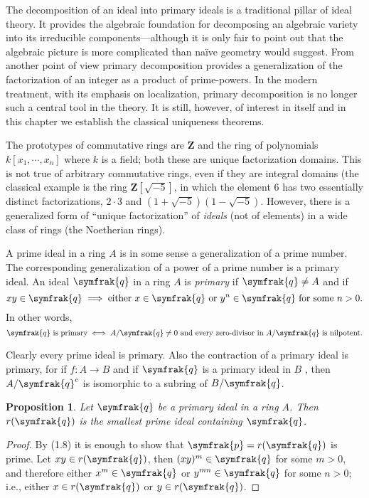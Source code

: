 \documentclass{standalone}
\newtheorem{proposition}[theorem]{Proposition}
\theoremstyle{definition}
\theoremstyle{remark}
\begin{document}
The decomposition of an ideal into primary ideals is a traditional pillar of ideal
theory. It provides the algebraic foundation for decomposing an algebraic
variety into its irreducible components---although it is only fair to point out
that the algebraic picture is more complicated than na\"{i}ve geometry would
suggest. From another point of view primary decomposition provides a generalization
of the factorization of an integer as a product of prime-powers. In
the modern treatment, with its emphasis on localization, primary decomposition
is no longer such a central tool in the theory. It is still, however, of interest in
itself and in this chapter we establish the classical uniqueness theorems.

The prototypes of commutative rings are $\mathbf{Z}$ and the ring of polynomials
 $k[x_1,\cdots,x_n]$ where $k$ is a field; both these are unique factorization domains.
This is not true of arbitrary commutative rings, even if they are integral domains
(the classical example is the ring $\mathbf{Z}[\sqrt{-5}]$, in which the element 6 has two
essentially distinct factorizations, $2\cdot 3$ and $(1+\sqrt{-5})(1-\sqrt{-5})$. However,
there is a generalized form of ``unique factorization'' of \textit{ideals} (not of elements)
in a wide class of rings (the Noetherian rings).

A prime ideal in a ring $A$ is in some sense a generalization of a prime number.
The corresponding generalization of a power of a prime number is a
primary ideal. An ideal $\symfrak{q}$ in a ring $A$ is \textit{primary}
if $\symfrak{q}\neq A$ and if
\[
  xy\in\symfrak{q}\implies\text{either }x\in\symfrak{q}\text{ or
  }y^n\in\symfrak{q}\text{ for some }n>0.
\]
In other words,
\[
\symfrak{q}\text{ is primary}\iff A/\symfrak{q}\ne 0 \text{ and every
  zero-divisor in }A/\symfrak{q}\text{ is nilpotent}.
\]

Clearly every prime ideal is primary. Also the contraction of a primary
ideal is primary, for if $f:A\to B$ and if $\symfrak{q}$ is a primary ideal in
$B$
, then $A/\symfrak{q}^c$ is isomorphic to a subring of $B/\symfrak{q}$.
\begin{proposition}
  Let $\symfrak{q}$ be a primary ideal in a ring $A$. Then $r(\symfrak{q})$ is the smallest
  prime ideal containing $\symfrak{q}$.
\end{proposition}
\begin{proof}
  By (1.8) it is enough to show that $\symfrak{p}=r(\symfrak{q})$ is prime.
  Let $xy\in r(\symfrak{q})$, then $(xy)^m\in \symfrak{q}$ for some $m>0$, and
  therefore either $x^m\in \symfrak{q}$ or $y^{mn}\in \symfrak{q}$ for some
  $n>0$; i.e., either $x\in r(\symfrak{q})$ or $y \in r(\symfrak{q})$.
\end{proof}
\end{document}
